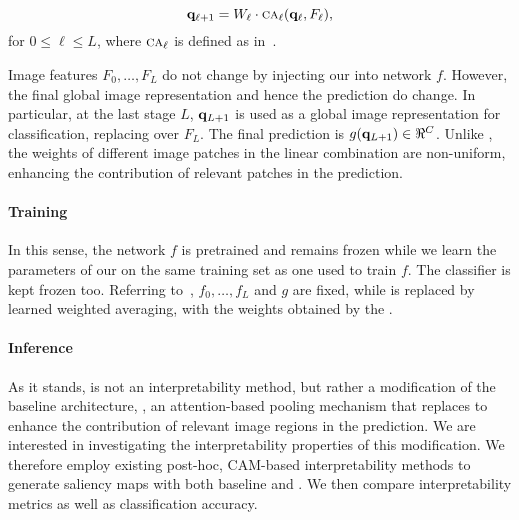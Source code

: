 \begin{equation}
	\mathbf{q}_{\ell+1} = W_\ell \cdot {\textsc{ca}}_\ell(\mathbf{q}_\ell, F_\ell),
\label{eq:qk-layer}
\end{equation}
for $0 \le \ell \le L$, where ${\textsc{ca}}_\ell$ is defined as in~. 

Image features $F_0, \dots, F_L$ do not change by injecting our \Ours into network $f$. However, 
the final global image representation and hence the prediction do change. In particular, at the 
last stage $L$, $\mathbf{q}_{L+1}$ is used as a global image representation for classification, 
replacing \gap over $F_L$. The final prediction is $g(\vq_{L+1}) \in \real^C$. Unlike \gap, the 
weights of different image patches in the linear combination are non-uniform, enhancing the 
contribution of relevant patches in the prediction.

\paragraph{Training}

In this sense, the network $f$ is pretrained and remains frozen while we learn the parameters of 
our \Ours on the same training set as one used to train $f$. The classifier is kept frozen too. 
Referring to~, $f_0, \dots, f_L$ and $g$ are fixed, while \gap is replaced by learned 
weighted averaging, with the weights obtained by the \Ours.

\paragraph{Inference}
As it stands, \Ours is not an interpretability method, but rather a modification of the baseline 
architecture, \ie, an attention-based pooling mechanism that replaces \gap to enhance the 
contribution of relevant image regions in the prediction. We are interested in investigating the 
interpretability properties of this modification. We therefore employ existing post-hoc, CAM-based 
interpretability methods to generate saliency maps with both baseline \gap and \Ours. We then 
compare interpretability metrics as well as classification accuracy.